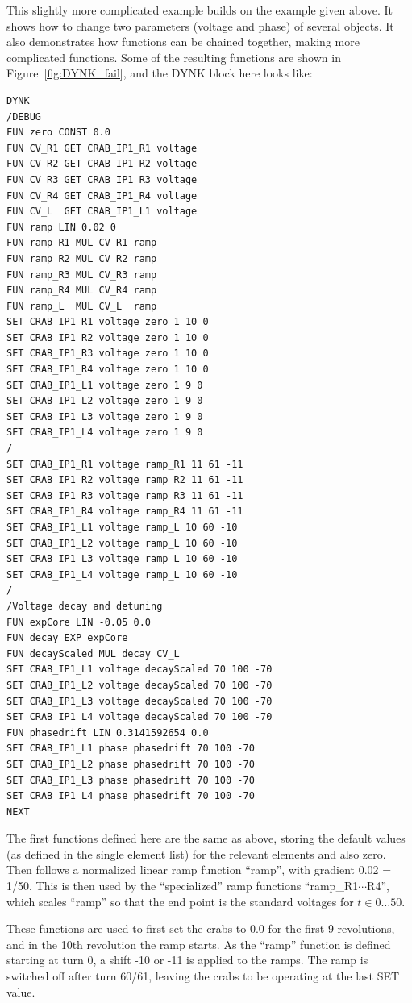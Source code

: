 \documentclass[a4paper,11pt]{report}
\begin{document}
This slightly more complicated example builds on the example given above.
It shows how to change two parameters (voltage and phase) of several objects.
It also demonstrates how functions can be chained together, making more complicated functions.
Some of the resulting functions are shown in Figure~\ref{fig:DYNK_fail}, and the DYNK block here looks like:
\begin{verbatim}
DYNK
/DEBUG
FUN zero CONST 0.0
FUN CV_R1 GET CRAB_IP1_R1 voltage
FUN CV_R2 GET CRAB_IP1_R2 voltage
FUN CV_R3 GET CRAB_IP1_R3 voltage
FUN CV_R4 GET CRAB_IP1_R4 voltage
FUN CV_L  GET CRAB_IP1_L1 voltage
FUN ramp LIN 0.02 0
FUN ramp_R1 MUL CV_R1 ramp
FUN ramp_R2 MUL CV_R2 ramp
FUN ramp_R3 MUL CV_R3 ramp
FUN ramp_R4 MUL CV_R4 ramp
FUN ramp_L  MUL CV_L  ramp
SET CRAB_IP1_R1 voltage zero 1 10 0
SET CRAB_IP1_R2 voltage zero 1 10 0
SET CRAB_IP1_R3 voltage zero 1 10 0
SET CRAB_IP1_R4 voltage zero 1 10 0
SET CRAB_IP1_L1 voltage zero 1 9 0
SET CRAB_IP1_L2 voltage zero 1 9 0
SET CRAB_IP1_L3 voltage zero 1 9 0
SET CRAB_IP1_L4 voltage zero 1 9 0
/
SET CRAB_IP1_R1 voltage ramp_R1 11 61 -11
SET CRAB_IP1_R2 voltage ramp_R2 11 61 -11
SET CRAB_IP1_R3 voltage ramp_R3 11 61 -11
SET CRAB_IP1_R4 voltage ramp_R4 11 61 -11
SET CRAB_IP1_L1 voltage ramp_L 10 60 -10
SET CRAB_IP1_L2 voltage ramp_L 10 60 -10
SET CRAB_IP1_L3 voltage ramp_L 10 60 -10
SET CRAB_IP1_L4 voltage ramp_L 10 60 -10
/
/Voltage decay and detuning
FUN expCore LIN -0.05 0.0
FUN decay EXP expCore
FUN decayScaled MUL decay CV_L
SET CRAB_IP1_L1 voltage decayScaled 70 100 -70
SET CRAB_IP1_L2 voltage decayScaled 70 100 -70
SET CRAB_IP1_L3 voltage decayScaled 70 100 -70
SET CRAB_IP1_L4 voltage decayScaled 70 100 -70
FUN phasedrift LIN 0.3141592654 0.0
SET CRAB_IP1_L1 phase phasedrift 70 100 -70
SET CRAB_IP1_L2 phase phasedrift 70 100 -70
SET CRAB_IP1_L3 phase phasedrift 70 100 -70
SET CRAB_IP1_L4 phase phasedrift 70 100 -70
NEXT
\end{verbatim}
The first functions defined here are the same as above, storing the default values (as defined in the single element list) for the relevant elements and also zero.
Then follows a normalized linear ramp function ``ramp'', with gradient 0.02 = 1/50.
This is then used by the ``specialized'' ramp functions ``ramp\_R1$\cdots$R4'', which scales ``ramp'' so that the end point is the standard voltages for $t\in 0\ldots50$.

These functions are used to first set the crabs to 0.0 for the first 9 revolutions, and in the 10th revolution the ramp starts.
As the ``ramp'' function is defined starting at turn 0, a shift -10 or -11 is applied to the ramps.
The ramp is switched off after turn 60/61, leaving the crabs to be operating at the last SET value.
\end{document}
